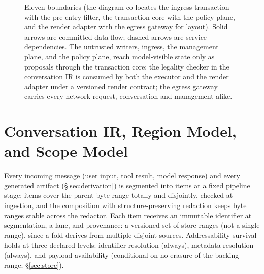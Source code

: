 \documentclass[11pt]{article}
\begin{document}
\begin{figure}[t]
{
}
\caption{Eleven boundaries (the diagram co-locates the ingress transaction with the pre-entry filter, the transaction core with the policy plane, and the render adapter with the egress gateway for layout). Solid arrows are committed data flow; dashed arrows are service dependencies. The untrusted writers, ingress, the management plane, and the policy plane, reach model-visible state only as proposals through the transaction core; the legality checker in the conversation IR is consumed by both the executor and the render adapter under a versioned render contract; the egress gateway carries every network request, conversation and management alike.}
\label{fig:arch}
\end{figure}

\section{Conversation IR, Region Model, and Scope Model}
\label{sec:ir}

Every incoming message (user input, tool result, model response) and every generated artifact (\S\ref{sec:derivation}) is segmented into items at a fixed pipeline stage; items cover the parent byte range totally and disjointly, checked at ingestion, and the composition with structure-preserving redaction keeps byte ranges stable across the redactor. Each item receives an immutable identifier at segmentation, a lane, and provenance: a versioned set of store ranges (not a single range), since a fold derives from multiple disjoint sources. Addressability survival holds at three declared levels: identifier resolution (always), metadata resolution (always), and payload availability (conditional on no erasure of the backing range; \S\ref{sec:store}).
\end{document}
